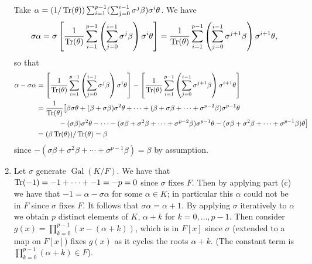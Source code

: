 \documentclass[11pt]{article}
\newcommand{\br}[1]{\left(#1\right)}
\newcommand{\sbr}[1]{\left[#1\right]}
\DeclareMathOperator{\Gal}{Gal}
\begin{document}
\begin{enumerate}[label=(\alph*)]
    Take $\alpha = (1/\Tr(\theta))\sum_{i=1}^{p-1}(\sum_{j=0}^{i-1}\sigma^j\beta)\sigma^i\theta$. We have \[\sigma\alpha = \sigma\sbr{\frac{1}{\Tr(\theta)}\sum_{i=1}^{p-1}\br{\sum_{j=0}^{i-1}\sigma^j\beta}\sigma^i\theta} = \frac{1}{\Tr(\theta)}\sum_{i=1}^{p-1}\br{\sum_{j=0}^{i-1}\sigma^{j+1}\beta}\sigma^{i+1}\theta,\] so that \begin{align*}
        \alpha-\sigma\alpha &= \sbr{\frac{1}{\Tr(\theta)}\sum_{i=1}^{p-1}\br{\sum_{j=0}^{i-1}\sigma^j\beta}\sigma^i\theta} - \sbr{\frac{1}{\Tr(\theta)}\sum_{i=1}^{p-1}\br{\sum_{j=0}^{i-1}\sigma^{j+1}\beta}\sigma^{i+1}\theta}\\
        &= \frac{1}{\Tr(\theta)}\big[\beta\sigma\theta + (\beta + \sigma\beta)\sigma^2\theta + \cdots + (\beta + \sigma\beta + \cdots +\sigma^{p-2}\beta)\sigma^{p-1}\theta \\
        &\quad\quad\quad\, -(\sigma\beta)\sigma^2\theta - \cdots-(\sigma\beta + \sigma^2\beta + \cdots + \sigma^{p-2}\beta)\sigma^{p-1}\theta-(\sigma\beta + \sigma^2\beta + \cdots + \sigma^{p-1}\beta)\theta\big]\\
        &= (\beta\Tr(\theta))/\Tr(\theta) = \beta
    \end{align*} since $-(\sigma\beta + \sigma^2\beta + \cdots + \sigma^{p-1}\beta) =\beta$ by assumption.
    \item Let $\sigma$ generate $\Gal(K/F)$. We have that $\Tr(-1) = -1 + \cdots + -1 = -p = 0$ since $\sigma$ fixes $F$. Then by applying part (c) we have that $-1 = \alpha - \sigma\alpha$ for some $\alpha \in K$; in particular this $\alpha$ could not be in $F$ since $\sigma$ fixes $F$. It follows that $\sigma\alpha = \alpha + 1$. By applying $\sigma$ iteratively to $\alpha$ we obtain $p$ distinct elements of $K$, $\alpha + k$ for $k = 0,\dots,p-1$. Then consider $g(x) = \prod_{k=0}^{p-1}(x-(\alpha+k))$, which is in $F[x]$ since $\sigma$ (extended to a map on $F[x]$) fixes $g(x)$ as it cycles the roots $\alpha + k $. (The constant term is $\prod_{k=0}^{p-1}(\alpha+k)\in F$).
    

\end{enumerate}
\end{document}

